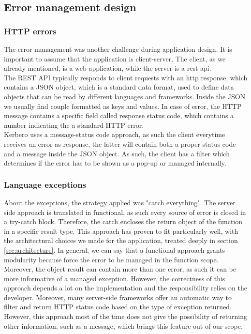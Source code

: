 \subsection{Error management design}
\subsubsection{HTTP errors}
The error management was another challenge during application design. It is important to assume that the application is client-server. The client, as we already mentioned, is a web application, while the server is a \acrshort{rest} \acrshort{api}.
\\ The REST API typically responds to client requests with an \acrshort{http} response, which contains a JSON object, which is a standard data format, used to define data objects that can be read by different languages and frameworks. Inside the JSON we usually find couple formatted as keys and values. In case of error, the HTTP message contains a specific field called response status code, which contains a number indicating the a standard HTTP error. 
\\ Kerbero uses a message-status code approach, as such the client everytime receives an error as response, the latter will contain both a proper status code and a message inside the JSON object. As such, the client has a filter which determines if the error has to be shown as a pop-up or managed internally.

\subsubsection{Language exceptions}
About the exceptions, the strategy applied was "catch everything". The server side approach is translated in functional, as such every source of error is closed in a try-catch block. Therefore, the catch encloses the return object of the function in a specific result type. This approach has proven to fit particularly well, with the architectural choices we made for the application, treated deeply in section \ref{sec:architecture}. In general, we can say that a functional approach grants modularity because force the error to be managed in the function scope. Moreover, the object result can contain more than one error, as such it can be more informative of a managed exception. However, the correctness of this approach depends a lot on the implementation and the responsibility relies on the developer. Moreover, many server-side frameworks offer an automatic way to filter and return HTTP status code based on the type of exception returned. However, this approach most of the time does not give the possibility of returning other information, such as a message, which brings this feature out of our scope.   

